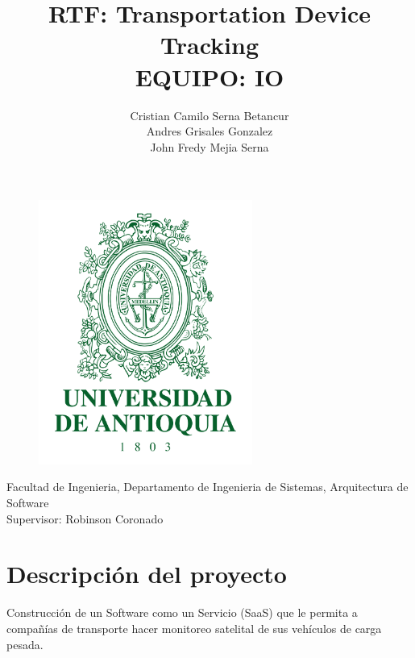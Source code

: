 \documentclass{article}
\title{\huge{\textbf{RTF: Transportation Device Tracking}} \\
\LARGE{EQUIPO: IO}}
\author{Cristian Camilo Serna Betancur \\ Andres Grisales Gonzalez \\ John Fredy Mejia Serna}
\begin{document}
\clearpage

\maketitle

\thispagestyle{empty}

\begin{center}
\begin{figure}[h]
    \centering
    \includegraphics[width=7cm]{pics/udea.png}%
    \label{fig:logo}\end{figure}
    \large{Facultad de Ingenieria, Departamento de Ingenieria de Sistemas,
     Arquitectura de Software \\ Supervisor: Robinson Coronado}
\end{center}

\newpage

\setcounter{page}{1}
\tableofcontents
\listoffigures
\listoftables


\section{Descripción del proyecto}
Construcción de un Software como un Servicio (SaaS) que le permita a compañías de transporte hacer monitoreo satelital de sus vehículos de carga pesada.
\end{document}
